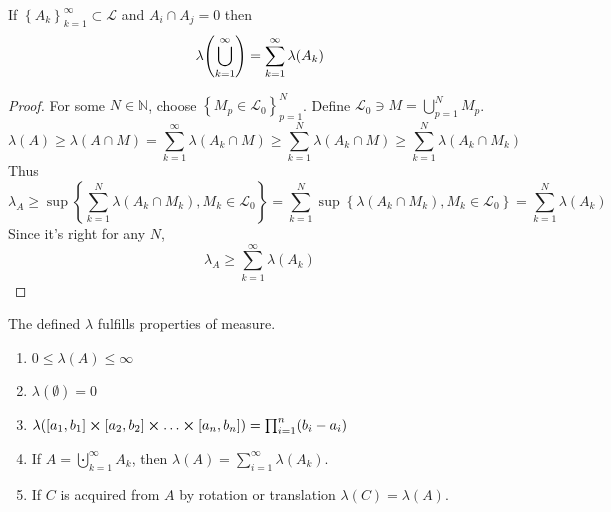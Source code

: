 \begin{prop}
If $\left\{ A_k \right\}_{k=1}^\infty \subset \mathcal{L}$ and $A_i\cap A_j=0$ then
$$\lambda\qty(\bigcup_{k=1}^\infty) = \sum_{k=1}^\infty \lambda(A_k)$$
\begin{proof}
	For some $N \in \mathbb{N}$, choose $\left\{ M_p \in \mathcal{L}_0 \right\}_{p=1}^N$. Define $\mathcal{L}_0 \ni M = \bigcup_{p=1}^N M_p$. 
	$$\lambda(A) \geq \lambda(A\cap M) = \sum_{k=1}^\infty \lambda (A_k \cap M) \geq \sum_{k=1}^N \lambda (A_k \cap M) \geq \sum_{k=1}^N \lambda (A_k \cap M_k)  $$
	Thus
	$$\lambda_A \geq \sup \left\{ \sum_{k=1}^N \lambda (A_k \cap M_k), M_k \in \mathcal{L}_0 \right\} = \sum_{k=1}^N \sup \left\{  \lambda (A_k \cap M_k), M_k \in \mathcal{L}_0 \right\} = \sum_{k=1}^N \lambda(A_k) $$
	Since it's right for any $N$,
	$$\lambda_A \geq \sum_{k=1}^\infty \lambda(A_k) $$
\end{proof}
\end{prop}

\begin{theorem}
	The defined $\lambda$ fulfills properties of measure.
	\begin{enumerate}
	\item $0\leq \lambda(A) \leq \infty$
\item $\lambda(\emptyset) = 0$
\item $\lambda(\qty[a_1,b_1]\cross\qty[a_2,b_2]\cross\dots\cross \qty[a_n,b_n]) = \prod_{i=1}^n (b_i-a_i)$
\item If $A = \bigcupdot_{k=1}^\infty A_k$, then $\lambda(A) = \sum_{i=1}^\infty \lambda(A_k)$.
\item If $C$ is acquired from $A$ by rotation or translation $\lambda(C) = \lambda(A)$.
	\end{enumerate}
\end{theorem}

